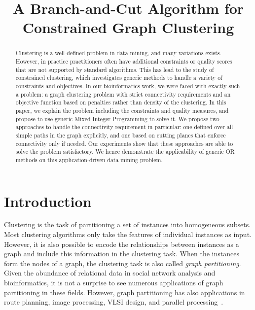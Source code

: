 \documentclass[conference,compsoc]{IEEEtran}
\begin{document}
\title{A Branch-and-Cut Algorithm for Constrained Graph Clustering}

\author{
\and
{}
\and
{}
}

\maketitle

\begin{abstract}
Clustering is a well-defined problem in data mining, and many variations exists. However, in practice practitioners often have additional constraints or quality scores that are not supported by standard algorithms. This has lead to the study of constrained clustering, which investigates generic methods to handle a variety of constraints and objectives. In our bioinformatics work, we were faced with exactly such a problem: a graph clustering problem with strict connectivity requirements and an objective function based on penalties rather than density of the clustering. In this paper, we explain the problem including the constraints and quality measures, and propose to use generic Mixed Integer Programming to solve it. We propose two approaches to handle the connectivity requirement in particular: one defined over all simple paths in the graph explicitly, and one based on cutting planes that enforce connectivity only if needed. Our experiments show that these approaches are able to solve the problem satisfactory. We hence demonstrate the applicability of generic OR methods on this application-driven data mining problem.
\end{abstract}

\section{Introduction}
\label{introduction}

Clustering is the task of partitioning a set of instances into
homogeneous subsets. Most clustering algorithms only take the features
of individual instances as input. However, it is also possible to
encode the relationships between instances as a graph and include this
information in the clustering task. When the instances form the nodes
of a graph, the clustering task is also called \emph{graph
  partitioning}. Given the abundance of relational data in social
network analysis and bioinformatics, it is not a surprise to see
numerous applications of graph partitioning in these fields. However,
graph partitioning has also applications in route planning, image
processing, VLSI design, and parallel processing~\cite{BulucMSS016}.
\end{document}
